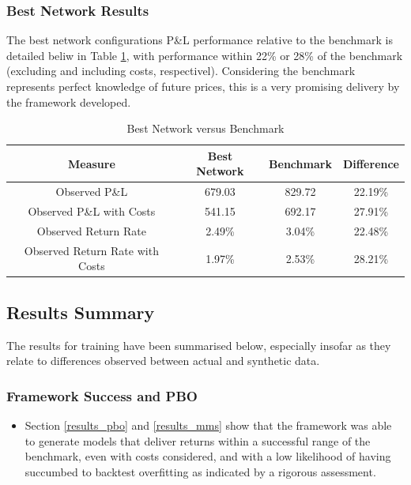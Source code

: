 \documentclass[a4paper,11pt,oneside]{article}
\theoremstyle{plain}
\theoremstyle{definition}
\begin{document}
\subsubsection{Best Network Results}

The best network configurations P\&L performance relative to the benchmark is detailed beliw in Table \ref{table_best_network}, with performance within 22\% or 28\% of the benchmark (excluding and including costs, respectivel). Considering the benchmark represents perfect knowledge of future prices, this is a very promising delivery by the framework developed.

\begin{table}[H]
	\centering
	\begin{tabular}{|c|c|c|c|}
		\hline
		\textbf{Measure} &\textbf{Best Network} & \textbf{Benchmark} & \textbf{Difference}\\\hline	
		{Observed P\&L} & {679.03} & {829.72} & {22.19\%} \\\hline
		{Observed P\&L with Costs} & {541.15} & {692.17} & {27.91\%} \\\hline
		{Observed Return Rate} & {2.49\%} & {3.04\%} & {22.48\%} \\\hline
		{Observed Return Rate with Costs} & {1.97\%} & {2.53\%} & {28.21\%} \\\hline
	\end{tabular}
	\newline\newline
	\caption{Best Network versus Benchmark}\label{tab_bestvsbenchmark}
	\label{table_best_network}
\end{table}




\newpage
\subsection{Results Summary}\label{results_summary}

The results for training have been summarised below, especially insofar as they relate to differences observed between actual and synthetic data.

\subsubsection{Framework Success and PBO}
\begin{itemize}
	\item[1] Section \ref{results_pbo} and \ref{results_mms} show that the framework was able to generate models that deliver returns within a successful range of the benchmark, even with costs considered, and with a low likelihood of having succumbed to backtest overfitting as indicated by a rigorous assessment.
\end{itemize}
\end{document}
